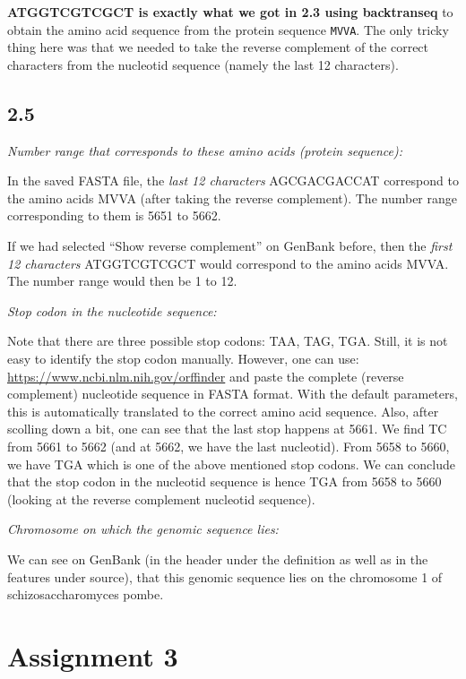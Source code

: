 \documentclass[]{article}
\begin{document}
\textbf{ATGGTCGTCGCT is exactly what we got in 2.3 using backtranseq} to
obtain the amino acid sequence from the protein sequence \texttt{MVVA}.
The only tricky thing here was that we needed to take the reverse
complement of the correct characters from the nucleotid sequence (namely
the last 12 characters).

\subsection{2.5}\label{section-4}

\emph{Number range that corresponds to these amino acids (protein
sequence):}

In the saved FASTA file, the \emph{last 12 characters} AGCGACGACCAT
correspond to the amino acids MVVA (after taking the reverse
complement). The number range corresponding to them is 5651 to 5662.

If we had selected ``Show reverse complement'' on GenBank before, then
the \emph{first 12 characters} ATGGTCGTCGCT would correspond to the
amino acids MVVA. The number range would then be 1 to 12.

\emph{Stop codon in the nucleotide sequence:}

Note that there are three possible stop codons: TAA, TAG, TGA. Still, it
is not easy to identify the stop codon manually. However, one can use:
\url{https://www.ncbi.nlm.nih.gov/orffinder} and paste the complete
(reverse complement) nucleotide sequence in FASTA format. With the
default parameters, this is automatically translated to the correct
amino acid sequence. Also, after scolling down a bit, one can see that
the last stop happens at 5661. We find TC from 5661 to 5662 (and at
5662, we have the last nucleotid). From 5658 to 5660, we have TGA which
is one of the above mentioned stop codons. We can conclude that the stop
codon in the nucleotid sequence is hence TGA from 5658 to 5660 (looking
at the reverse complement nucleotid sequence).

\emph{Chromosome on which the genomic sequence lies:}

We can see on GenBank (in the header under the definition as well as in
the features under source), that this genomic sequence lies on the
chromosome 1 of schizosaccharomyces pombe.

\section{Assignment 3}\label{assignment-3}
\end{document}
